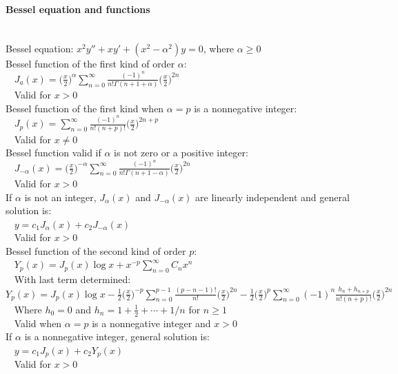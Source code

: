 \documentclass[10pt]{article}
\begin{document}
\paragraph{Bessel equation and functions}\ \\
Bessel equation: $x^2y'' + xy' + (x^2 - \alpha^2)y = 0$, where $\alpha \geq 0$\\
Bessel function of the first kind of order $\alpha$:\\
$\phantom{x}$ $J_a(x) = 
\bigl(\frac{x}{2}\bigr)^\alpha \sum_{n=0}^\infty \frac{(-1)^n}{n!\Gamma(n+1+\alpha)}\bigl(\frac{x}{2}\bigr)^{2n}$\\
$\phantom{x}$ Valid for $x>0$\\
Bessel function of the first kind when $\alpha = p$ is a nonnegative integer:\\
$\phantom{x}$ $J_p(x) = \sum_{n=0}^\infty \frac{(-1)^n}{n!(n+p)!} \bigl(\frac{x}{2}\bigr)^{2n+p}$\\
$\phantom{x}$ Valid for $x \neq 0$\\
Bessel function valid if $\alpha$ is not zero or a positive integer:\\
$\phantom{x}$ $J_{-\alpha}(x) = 
\bigl(\frac{x}{2}\bigr)^{-\alpha} \sum_{n=0}^\infty \frac{(-1)^n}{n!\Gamma(n+1-\alpha)}\bigl(\frac{x}{2}\bigr)^{2n}$\\
$\phantom{x}$ Valid for $x>0$\\
If $\alpha$ is not an integer, $J_\alpha(x)$ and $J_{-\alpha}(x)$ are linearly independent and general solution is:\\
$\phantom{x}$ $y = c_1 J_\alpha(x) + c_2 J_{-\alpha}(x)$\\
$\phantom{x}$ Valid for $x>0$\\
Bessel function of the second kind of order $p$:\\
$\phantom{x}$ $Y_p(x) = J_p(x) \log x + x^{-p} \sum_{n=0}^\infty C_n x^n$\\
$\phantom{x}$ With last term determined:
$Y_p(x) = J_p(x) \log x - \frac{1}{2}\bigl(\frac{x}{2}\bigr)^{-p} \sum_{n=0}^{p-1} \frac{(p-n-1)!}{n!}
\bigl(\frac{x}{2}\bigr)^{2n} - \frac{1}{2}\bigl(\frac{x}{2}\bigr)^p \sum_{n=0}^\infty
(-1)^n \frac{h_n + h_{n+p}}{n!(n+p)!}\bigl(\frac{x}{2}\bigr)^{2n}$\\
$\phantom{x}$ Where $h_0 = 0$ and $h_n = 1 + \frac{1}{2} + \dotsb + 1/n$ for $n \geq 1$\\
$\phantom{x}$ Valid when $\alpha = p$ is a nonnegative integer and $x > 0$\\
If $\alpha$ is a nonnegative integer, general solution is:\\
$\phantom{x}$ $y = c_1 J_p(x) + c_2 Y_p(x)$\\
$\phantom{x}$ Valid for $x>0$
\end{document}
